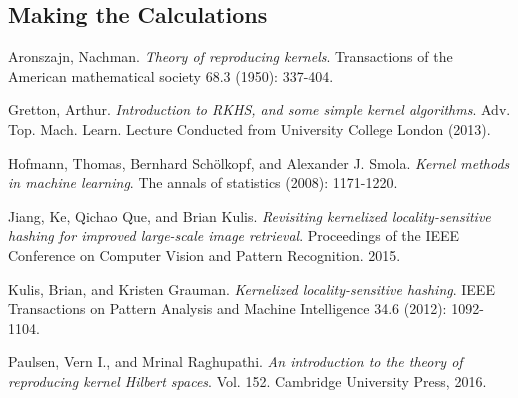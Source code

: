 \documentclass[twoside,11pt]{homework}
\begin{document}
\begin{multicols}{2}
\subsection{Making the Calculations}

\begin{thebibliography}{9}
  
 Aronszajn, Nachman. \emph{Theory of reproducing kernels}. Transactions of the American mathematical society 68.3 (1950): 337-404.

 Gretton, Arthur. \emph{Introduction to RKHS, and some simple kernel algorithms}. Adv. Top. Mach. Learn. Lecture Conducted from University College London (2013).

 Hofmann, Thomas, Bernhard Schölkopf, and Alexander J. Smola. \emph{Kernel methods in machine learning}. The annals of statistics (2008): 1171-1220.

 Jiang, Ke, Qichao Que, and Brian Kulis. \emph{Revisiting kernelized locality-sensitive hashing for improved large-scale image retrieval}. Proceedings of the IEEE Conference on Computer Vision and Pattern Recognition. 2015.
  
 Kulis, Brian, and Kristen Grauman. \emph{Kernelized locality-sensitive hashing}. IEEE Transactions on Pattern Analysis and Machine Intelligence 34.6 (2012): 1092-1104.

 Paulsen, Vern I., and Mrinal Raghupathi. \emph{An introduction to the theory of reproducing kernel Hilbert spaces}. Vol. 152. Cambridge University Press, 2016. 

\end{thebibliography}

\end{multicols}
\end{document}

